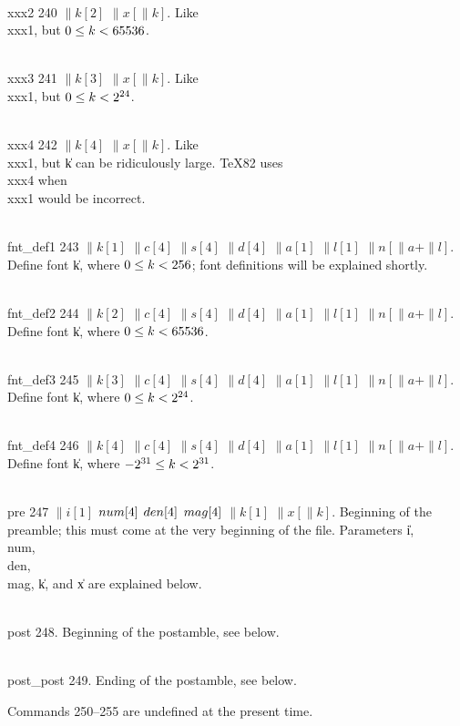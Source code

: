 \yskip\hang\\{xxx2} 240 $\|k[2]$ $\|x[\|k]$. Like \\{xxx1}, but $0\le\hbox{$k$}<65536$.

\yskip\hang\\{xxx3} 241 $\|k[3]$ $\|x[\|k]$. Like \\{xxx1}, but $0\L\|k<%
\hbox{$2^{24}$}$.

\yskip\hang\\{xxx4} 242 $\|k[4]$ $\|x[\|k]$. Like \\{xxx1}, but \|k can be
ridiculously
large. \TeX82 uses \\{xxx4} when \\{xxx1} would be incorrect.

\yskip\hang\\{fnt\_def1} 243 $\|k[1]$ $\|c[4]$ $\|s[4]$ $\|d[4]$ $\|a[1]$ $%
\|l[1]$ $\|n[\|a+\|l]$.
Define font \|k, where $0\le\hbox{$k$}<256$; font definitions will be explained
shortly.

\yskip\hang\\{fnt\_def2} 244 $\|k[2]$ $\|c[4]$ $\|s[4]$ $\|d[4]$ $\|a[1]$ $%
\|l[1]$ $\|n[\|a+\|l]$.
Define font \|k, where $0\le\hbox{$k$}<65536$.

\yskip\hang\\{fnt\_def3} 245 $\|k[3]$ $\|c[4]$ $\|s[4]$ $\|d[4]$ $\|a[1]$ $%
\|l[1]$ $\|n[\|a+\|l]$.
Define font \|k, where $0\le\hbox{$k$}<\hbox{$2^{24}$}$.

\yskip\hang\\{fnt\_def4} 246 $\|k[4]$ $\|c[4]$ $\|s[4]$ $\|d[4]$ $\|a[1]$ $%
\|l[1]$ $\|n[\|a+\|l]$.
Define font \|k, where $\hbox{$-2^{31}$}\le\hbox{$k$}<\hbox{$2^{31}$}$.

\yskip\hang\\{pre} 247 $\|i[1]$ $\\{num}[4]$ $\\{den}[4]$ $\\{mag}[4]$ $\|k[1]$
$\|x[\|k]$.
Beginning of the preamble; this must come at the very beginning of the
file. Parameters \|i, \\{num}, \\{den}, \\{mag}, \|k, and \|x are explained
below.

\yskip\hang\\{post} 248. Beginning of the postamble, see below.

\yskip\hang\\{post\_post} 249. Ending of the postamble, see below.

\yskip\noindent Commands 250--255 are undefined at the present time.

